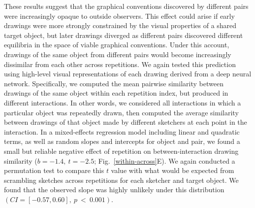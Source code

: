 \documentclass[11pt,letterpaper]{article}
\begin{document}
These results suggest that the graphical conventions discovered by different pairs were increasingly opaque to outside observers.
This effect could arise if early drawings were more strongly constrained by the visual properties of a shared target object, but later drawings diverged as different pairs discovered different equilibria in the space of viable graphical conventions.
Under this account, drawings of the same object from different pairs would become increasingly dissimilar from each other across repetitions.
We again tested this prediction using high-level visual representations of each drawing derived from a deep neural network.
Specifically, we computed the mean pairwise similarity between drawings of the same object within each repetition index, but produced in different interactions.
In other words, we considered all interactions in which a particular object was repeatedly drawn, then computed the average similarity between drawings of that object made by different sketchers at each point in the interaction.
In a mixed-effects regression model including linear and quadratic terms, as well as random slopes and intercepts for object and pair, we found a small but reliable negative effect of repetition on between-interaction drawing similarity ($b = -1.4, ~t = -2.5$; Fig.~\ref{within-across}E). %
We again conducted a permutation test to compare this $t$ value with what would be expected from scrambling sketches across repetitions for each sketcher and target object.
We found that the observed slope was highly unlikely under this distribution $(CI = [-0.57, 0.60],~p~<~0.001)$.




\end{document}

